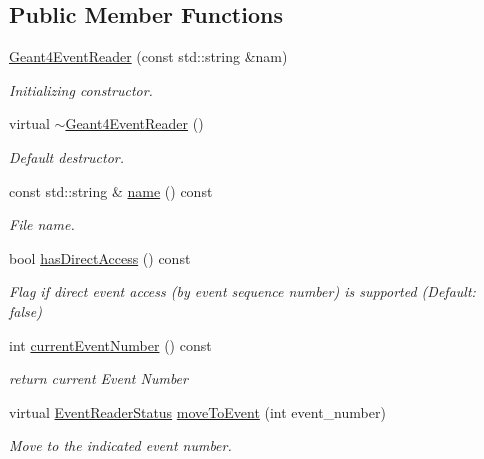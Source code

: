 \subsection*{Public Member Functions}
\begin{DoxyCompactItemize}
\item 
\hyperlink{class_d_d4hep_1_1_simulation_1_1_geant4_event_reader_abf6dc1e6d792edd26889a527310054f0}{Geant4\+Event\+Reader} (const std\+::string \&nam)
\begin{DoxyCompactList}\small\item\em Initializing constructor. \end{DoxyCompactList}\item 
virtual \hyperlink{class_d_d4hep_1_1_simulation_1_1_geant4_event_reader_a79666927f8c31df30ceb03ea5f1c7b12}{$\sim$\+Geant4\+Event\+Reader} ()
\begin{DoxyCompactList}\small\item\em Default destructor. \end{DoxyCompactList}\item 
const std\+::string \& \hyperlink{class_d_d4hep_1_1_simulation_1_1_geant4_event_reader_a4a5b4a2126e4667f79c80a22bd3f929b}{name} () const
\begin{DoxyCompactList}\small\item\em File name. \end{DoxyCompactList}\item 
bool \hyperlink{class_d_d4hep_1_1_simulation_1_1_geant4_event_reader_a4df8c1d610e21df1d887083ca7ff3ffb}{has\+Direct\+Access} () const
\begin{DoxyCompactList}\small\item\em Flag if direct event access (by event sequence number) is supported (Default\+: false) \end{DoxyCompactList}\item 
int \hyperlink{class_d_d4hep_1_1_simulation_1_1_geant4_event_reader_af16b54da1320a845c23c1a329582565f}{current\+Event\+Number} () const
\begin{DoxyCompactList}\small\item\em return current Event Number \end{DoxyCompactList}\item 
virtual \hyperlink{class_d_d4hep_1_1_simulation_1_1_geant4_event_reader_ae4f4bc83ffcf5b0c1868ad78859851e7}{Event\+Reader\+Status} \hyperlink{class_d_d4hep_1_1_simulation_1_1_geant4_event_reader_a0b6d2fe12ae259534cbe7a5b6e35b642}{move\+To\+Event} (int event\+\_\+number)
\begin{DoxyCompactList}\small\item\em Move to the indicated event number. \end{DoxyCompactList}\item 

\end{DoxyCompactItemize}
